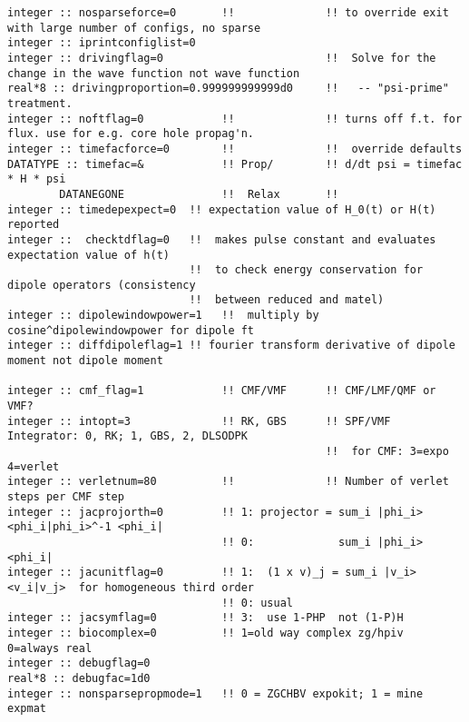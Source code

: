 \begin{verbatim}
integer :: nosparseforce=0       !!              !! to override exit with large number of configs, no sparse
integer :: iprintconfiglist=0
integer :: drivingflag=0                         !!  Solve for the change in the wave function not wave function 
real*8 :: drivingproportion=0.999999999999d0     !!   -- "psi-prime" treatment.
integer :: noftflag=0            !!              !! turns off f.t. for flux. use for e.g. core hole propag'n.
integer :: timefacforce=0        !!              !!  override defaults
DATATYPE :: timefac=&            !! Prop/        !! d/dt psi = timefac * H * psi
        DATANEGONE               !!  Relax       !!
integer :: timedepexpect=0  !! expectation value of H_0(t) or H(t) reported
integer ::  checktdflag=0   !!  makes pulse constant and evaluates expectation value of h(t) 
                            !!  to check energy conservation for dipole operators (consistency 
                            !!  between reduced and matel)
integer :: dipolewindowpower=1   !!  multiply by cosine^dipolewindowpower for dipole ft
integer :: diffdipoleflag=1 !! fourier transform derivative of dipole moment not dipole moment

integer :: cmf_flag=1            !! CMF/VMF      !! CMF/LMF/QMF or VMF?
integer :: intopt=3              !! RK, GBS      !! SPF/VMF Integrator: 0, RK; 1, GBS, 2, DLSODPK  
                                                 !!  for CMF: 3=expo 4=verlet
integer :: verletnum=80          !!              !! Number of verlet steps per CMF step
integer :: jacprojorth=0         !! 1: projector = sum_i |phi_i> <phi_i|phi_i>^-1 <phi_i|
                                 !! 0:             sum_i |phi_i> <phi_i|
integer :: jacunitflag=0         !! 1:  (1 x v)_j = sum_i |v_i><v_i|v_j>  for homogeneous third order
                                 !! 0: usual          
integer :: jacsymflag=0          !! 3:  use 1-PHP  not (1-P)H
integer :: biocomplex=0          !! 1=old way complex zg/hpiv  0=always real
integer :: debugflag=0
real*8 :: debugfac=1d0
integer :: nonsparsepropmode=1   !! 0 = ZGCHBV expokit; 1 = mine expmat
\end{verbatim}
